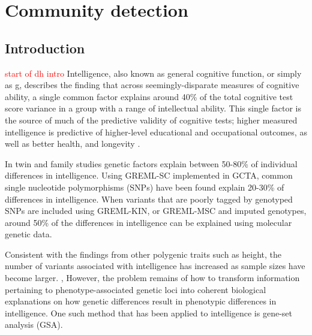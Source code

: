 
\chapter{Community detection}
\label{chap:community detection}






\section{Introduction}
\textcolor{red}{start of dh intro}
Intelligence, also known as general cognitive function,\cite{davies2015genetic} or simply as g,\cite{spearman1961general} describes the finding that across seemingly-disparate measures of cognitive ability, a single common factor explains around 40\% of the total cognitive test score variance in a group with a range of intellectual ability.  \cite{carroll1993human}  This single factor is the source of much of the predictive validity of cognitive tests; higher measured intelligence is predictive of higher-level educational and occupational outcomes, \cite{strenze2007intelligence}  as well as better health, and longevity .\cite{deary2012annrev} 

In twin and family studies genetic factors explain between 50-80\% of individual differences in intelligence. Using GREML-SC implemented in GCTA, \cite{yang2011gcta}  common single nucleotide polymorphisms (SNPs) have been found explain 20-30\% \cite{marioni2014common}  of differences in intelligence. When variants that are poorly tagged by genotyped SNPs are included using GREML-KIN, \cite{xia2016pedigree}  or GREML-MSC and imputed genotypes, around 50\% of the differences in intelligence can be explained using molecular genetic data. \cite{hill2018genomic} 

Consistent with the findings from other polygenic traits such as height, \cite{wood2014defining}  the number of variants associated with intelligence has increased as sample sizes have become larger. \cite{sniekers2017genome},\cite{hill2019combined}  However, the problem remains of how to transform information pertaining to phenotype-associated genetic loci into coherent biological explanations on how genetic differences result in phenotypic differences in intelligence. One such method that has been applied to intelligence is gene-set analysis (GSA). 

